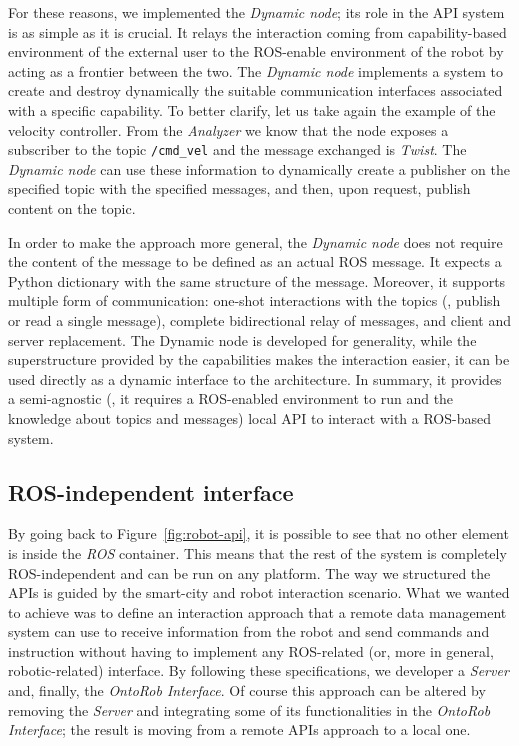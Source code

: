 For these reasons, we implemented the \textit{Dynamic node}; its role in the API system is as simple as it is crucial. It relays the interaction coming from capability-based environment of the external user to the ROS-enable environment of the robot by acting as a frontier between the two. The \textit{Dynamic node} implements a system to create and destroy dynamically the suitable communication interfaces associated with a specific capability. To better clarify, let us take again the example of the velocity controller. From the \textit{Analyzer} we know that the node exposes a subscriber to the topic \texttt{/cmd\_vel} and the message exchanged is \textit{Twist}. The \textit{Dynamic node} can use these information to dynamically create a publisher on the specified topic with the specified messages, and then, upon request, publish content on the topic.

In order to make the approach more general, the \textit{Dynamic node} does not require the content of the message to be defined as an actual ROS message. It expects a Python dictionary with the same structure of the message. Moreover, it supports multiple form of communication: one-shot interactions with the topics (\ie, publish or read a single message), complete bidirectional relay of messages, and client and server replacement. The {Dynamic node} is developed for generality, while the superstructure provided by the capabilities makes the interaction easier, it can be used directly as a dynamic interface to the architecture. In summary, it provides a semi-agnostic (\ie, it requires a ROS-enabled environment to run and the knowledge about topics and messages) local API to interact with a ROS-based system.

\subsection{ROS-independent interface}
By going back to Figure~\ref{fig:robot-api}, it is possible to see that no other element is inside the \textit{ROS} container. This means that the rest of the system is completely ROS-independent and can be run on any platform. The way we structured the APIs is guided by the smart-city and robot interaction scenario. What we wanted to achieve was to define an interaction approach that a remote data management system can use to receive information from the robot and send commands and instruction without having to implement any ROS-related (or, more in general, robotic-related) interface. By following these specifications, we developer a \textit{Server} and, finally, the \textit{OntoRob Interface}. Of course this approach can be altered by removing the \textit{Server} and integrating some of its functionalities in the \textit{OntoRob Interface}; the result is moving from a remote APIs approach to a local one.

